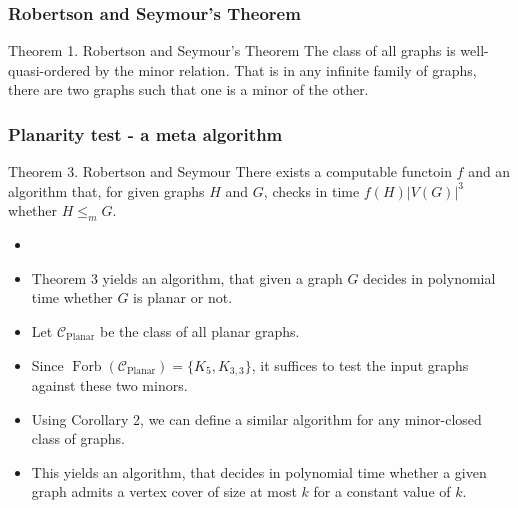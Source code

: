\documentclass[t,usenames,dvipsnames]{beamer}
\newcommand{\cplanar}{\mathcal{C}_{\operatorname{Planar}}}
\begin{document}
\begin{frame} \frametitle{Robertson and Seymour's Theorem}
	\begin{block}{Theorem 1. Robertson and Seymour's Theorem}
		The class of all graphs is well-quasi-ordered by the minor relation. That is in any
		infinite family of graphs, there are two graphs such that one is a minor of the
		other.
	\end{block}

	
\end{frame}
\begin{frame} \frametitle{Planarity test - a meta algorithm}
	\begin{block}{Theorem 3. Robertson and Seymour}
			There exists a computable functoin $f$ and an algorithm that, for given
			graphs $H$ and $G$, checks in time $f(H)|V(G)|^3$ whether $H \leq_m G$.
	\end{block}
	\begin{itemize}[<+->]
		\item []
		\item Theorem 3 yields an algorithm, that given a graph $G$ decides in polynomial
			time whether $G$ is planar or not.
		\item Let $\cplanar$ be the class of all planar graphs.
		\item Since $\operatorname{Forb}(\cplanar) = \{K_5, K_{3,3}\}$, it suffices to test
			the input graphs against these two minors.
		\item Using Corollary 2, we can define a similar algorithm for any minor-closed
			class of graphs.
		\item This yields an algorithm, that decides in polynomial time whether a given
			graph admits a vertex cover of size at most $k$ for a constant value of
			$k$.
	\end{itemize}
\end{frame}
\end{document}

